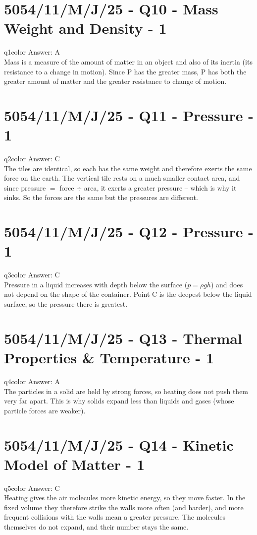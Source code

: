 \documentclass[11pt,a4paper]{article}
\newcommand{\examq}[4]{\section[#1 - Q#2]{#1 - Q#2 - #3 - #4}}
\begin{document}
\examq{5054/11/M/J/25}{10}{Mass Weight and Density}{1}

\begin{ansbox}{q1color}
Answer: $\boxed{\text{A}}$\\[4pt]
Mass is a measure of the amount of matter in an object and also of its inertia (its resistance to a change in motion). Since P has the greater mass, P has both the greater amount of matter and the greater resistance to change of motion.
\end{ansbox}

\examq{5054/11/M/J/25}{11}{Pressure}{1}

\begin{ansbox}{q2color}
Answer: $\boxed{\text{C}}$\\[4pt]
The tiles are identical, so each has the same weight and therefore exerts the same force on the earth. The vertical tile rests on a much smaller contact area, and since pressure $=$ force $\div$ area, it exerts a greater pressure -- which is why it sinks. So the forces are the same but the pressures are different.
\end{ansbox}

\examq{5054/11/M/J/25}{12}{Pressure}{1}

\begin{ansbox}{q3color}
Answer: $\boxed{\text{C}}$\\[4pt]
Pressure in a liquid increases with depth below the surface ($p = \rho g h$) and does not depend on the shape of the container. Point C is the deepest below the liquid surface, so the pressure there is greatest.
\end{ansbox}

\examq{5054/11/M/J/25}{13}{Thermal Properties \& Temperature}{1}

\begin{ansbox}{q4color}
Answer: $\boxed{\text{A}}$\\[4pt]
The particles in a solid are held by strong forces, so heating does not push them very far apart. This is why solids expand less than liquids and gases (whose particle forces are weaker).
\end{ansbox}

\examq{5054/11/M/J/25}{14}{Kinetic Model of Matter}{1}

\begin{ansbox}{q5color}
Answer: $\boxed{\text{C}}$\\[4pt]
Heating gives the air molecules more kinetic energy, so they move faster. In the fixed volume they therefore strike the walls more often (and harder), and more frequent collisions with the walls mean a greater pressure. The molecules themselves do not expand, and their number stays the same.
\end{ansbox}
\end{document}
